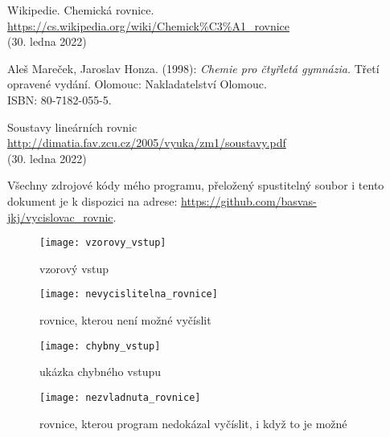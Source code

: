 \documentclass[12pt,a4paper]{report}
\begin{document}
\begin{thebibliography}{99}
	
Wikipedie. Chemická rovnice.\\
\url{https://cs.wikipedia.org/wiki/Chemick\%C3\%A1_rovnice}\\
(30. ledna 2022)

Aleš Mareček, Jaroslav Honza. (1998): \textit{Chemie pro čtyřletá gymnázia.} Třetí opravené vydání. Olomouc: Nakladatelství Olomouc.\\
ISBN: 80-7182-055-5.

Soustavy lineárních rovnic\\
\url{http://dimatia.fav.zcu.cz/2005/vyuka/zm1/soustavy.pdf}\\
(30. ledna 2022)
\end{thebibliography}

Všechny zdrojové kódy mého programu, přeložený spustitelný soubor i tento dokument je k dispozici na adrese: \url{https://github.com/basvas-jkj/vycislovac_rovnic}.

\begin{figure}[h]
	\centering
	\texttt{[image: vzorovy\_vstup]}
	\caption{vzorový vstup}
\end{figure}
\begin{figure}[h]
	\centering
	\texttt{[image: nevycislitelna\_rovnice]}
	\caption{rovnice, kterou není možné vyčíslit}
\end{figure}
\begin{figure}[h]
	\centering
	\texttt{[image: chybny\_vstup]}
	\caption{ukázka chybného vstupu}
\end{figure}
\begin{figure}[h]
\centering
\texttt{[image: nezvladnuta\_rovnice]}
\caption{rovnice, kterou program nedokázal vyčíslit, i když to je možné}
\end{figure}

\openright
\end{document}
